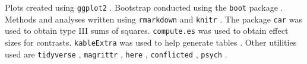 \documentclass[11pt,]{article}
\begin{document}
Plots created using \texttt{ggplot2} \citep{wickham_ggplot2:_2016}.
Bootstrap conducted using the \texttt{boot} package
\citep{canty_boot:_2017}. Methods and analyses written using
\texttt{rmarkdown} \citep{allaire_rmarkdown:_2019} and \texttt{knitr}
\citep{xie_knitr:_2019}. The package \texttt{car} \citep{fox_r_2011} was
used to obtain type III sums of squares. \texttt{compute.es}
\citep{re_compute.es:_2013} was used to obtain effect sizes for
contrasts. \texttt{kableExtra} was used to help generate tables
\citep{zhu_kableextra:_2019}. Other utilities used are
\texttt{tidyverse} \citep{wickham_tidyverse:_2017}, \texttt{magrittr}
\citep{bache_magrittr:_2014}, \texttt{here} \citep{muller_here:_2017},
\texttt{conflicted} \citep{wickham_conflicted:_2018}, \texttt{psych}
\citep{revelle_psych:_2018}.



\end{document}
